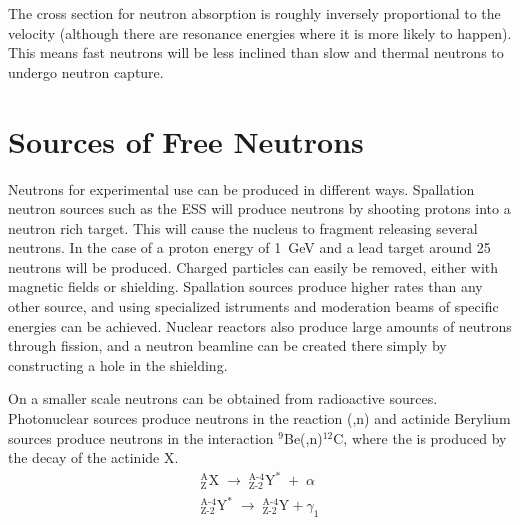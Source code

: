 \documentclass[main.tex]{subfiles}
\begin{document}
The cross section for neutron absorption is roughly inversely proportional to the velocity (although there are resonance energies where it is more likely to happen). This means fast neutrons will be less inclined than slow and thermal neutrons to undergo neutron capture. 



\section{Sources of Free Neutrons}
Neutrons for experimental use can be produced in different ways. Spallation neutron sources such as the ESS will produce neutrons by shooting protons into a neutron rich target. This will cause the nucleus to fragment releasing several neutrons. In the case of a proton energy of \SI{1}{\GeV} and a lead target around 25 neutrons will be produced\cite[pg.46]{Tavernier}. Charged particles can easily be removed, either with magnetic fields or shielding. Spallation sources produce higher rates than any other source, and using specialized istruments and moderation beams of specific energies can be achieved. Nuclear reactors also produce large amounts of neutrons through fission, and a neutron beamline can be created there simply by constructing a hole in the shielding\cite[446]{Krane}. 

On a smaller scale neutrons can be obtained from radioactive sources. Photonuclear sources produce neutrons in the reaction (\textgamma ,n) and actinide Berylium sources produce neutrons in the interaction $^\text{9}$Be(\textalpha,n)$^\text{12}$C, where the \textalpha\;is produced by the decay of the actinide X\cite[pg.8]{Leo}.
\begin{equation}
	\begin{split}
		^\textrm{A}_\textrm{Z}\textrm{X}\;\rightarrow\;^{\textrm{A-4}}_{\textrm{Z-2}}\textrm{Y}^*\;+\;\alpha \\
		^{\textrm{A-4}}_{\textrm{Z-2}}\textrm{Y}^*\;\rightarrow\;^{\textrm{A-4}}_{\textrm{Z-2}}\textrm{Y} + \gamma_1
	\label{eq:actinide}
	\end{split}
\end{equation}
\end{document}
